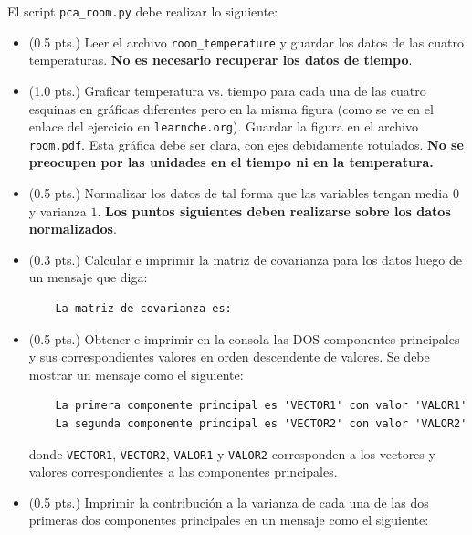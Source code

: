 \documentclass[11pt,letterpaper]{exam}
\begin{document}
\begin{questions}
 
\question[1.3]



\question[4.7]

El script \verb'pca_room.py' debe realizar lo siguiente:

\begin{itemize}
	\item (0.5 pts.) Leer el archivo \verb'room_temperature' y guardar los datos de las cuatro temperaturas. \textbf{No es necesario recuperar los datos de tiempo}.
	\item (1.0 pts.) Graficar temperatura vs. tiempo para cada una de las cuatro esquinas en gr\'aficas diferentes pero en la misma figura (como se ve en el enlace del ejercicio en \verb'learnche.org'). Guardar la figura en el archivo \verb'room.pdf'. Esta gr\'afica debe ser clara, con ejes debidamente rotulados. \textbf{No se preocupen por las unidades en el tiempo ni en la temperatura.}
	\item (0.5 pts.) Normalizar los datos de tal forma que las variables tengan media $0$ y varianza $1$. \textbf{Los puntos siguientes deben realizarse sobre los datos normalizados}.
	\item (0.3 pts.) Calcular e imprimir la matriz de covarianza para los datos luego de un mensaje que diga:

\begin{verbatim}
	La matriz de covarianza es:
\end{verbatim}

	\item (0.5 pts.) Obtener e imprimir en la consola las DOS componentes principales y sus correspondientes valores en orden descendente de valores. Se debe mostrar un mensaje como el siguiente:

\begin{verbatim}
	La primera componente principal es 'VECTOR1' con valor 'VALOR1'
	La segunda componente principal es 'VECTOR2' con valor 'VALOR2'
\end{verbatim}

donde \verb'VECTOR1', \verb'VECTOR2', \verb'VALOR1' y \verb'VALOR2' corresponden a los vectores y valores correspondientes a las componentes principales.

\item (0.5 pts.) Imprimir la contribuci\'on a la varianza de cada una de las dos primeras dos componentes principales en un mensaje como el siguiente:


\end{itemize}
\end{questions}
\end{document}
